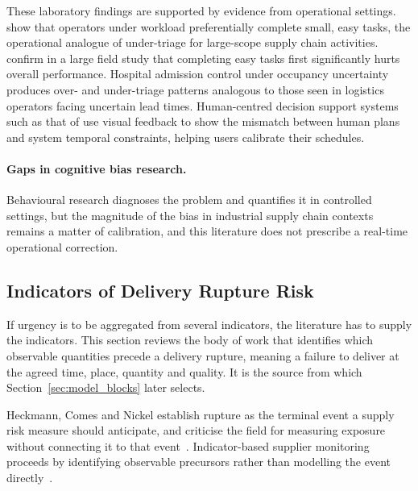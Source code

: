 These laboratory findings are supported by evidence from operational settings. \textcite{rusou2020psychology} show that operators under workload preferentially
complete small, easy tasks, the operational analogue of under-triage for large-scope supply
chain activities. \textcite{diwa2020task} confirm in a large field study
that completing easy tasks first significantly hurts overall performance. Hospital
admission control under occupancy uncertainty~\autocite{kim2020admission} produces over-
and under-triage patterns analogous to those seen in logistics operators facing uncertain
lead times. Human-centred decision support systems such as that of \textcite{rosenthal2020human} use visual feedback to show the mismatch between human
plans and system temporal constraints, helping users calibrate their schedules.

\paragraph{Gaps in cognitive bias research.}
Behavioural research diagnoses the problem and quantifies it in controlled settings, but
the magnitude of the bias in industrial supply chain contexts remains a matter of
calibration, and this literature does not prescribe a real-time operational correction.

\subsection{Indicators of Delivery Rupture Risk}
\label{sec:lit_indicators}

If urgency is to be aggregated from several indicators, the literature has to supply the
indicators. This section reviews the body of work that identifies which observable
quantities precede a delivery rupture, meaning a failure to deliver at the agreed time,
place, quantity and quality. It is the source from which
Section~\ref{sec:model_blocks} later selects.

Heckmann, Comes and Nickel establish rupture as the terminal event a supply risk measure
should anticipate, and criticise the field for measuring exposure without connecting it to
that event~\autocite{heckmann2015critical}. Indicator-based supplier monitoring proceeds by
identifying observable precursors rather than modelling the event
directly~\autocite{mokhtar2019supplier}.

